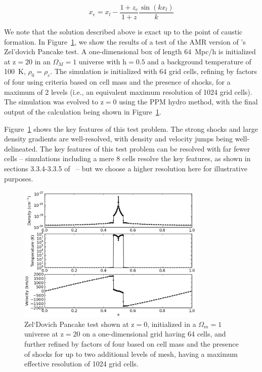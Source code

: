 \begin{equation}
x_e = x_l - \frac{1 + z_c}{1 + z} \frac{\sin(k x_l)}{k}
\end{equation}

We note that the solution described above is exact up to the point of
caustic formation.  In Figure~\ref{fig.pancake}, we show the results
of a test of the AMR version of \enzo's Zel'dovich Pancake test.  A
one-dimensional box of length $64$~Mpc/h is initialized at z$ = 20$ in
an $\Omega_M = 1$ universe with h$ = 0.5$ and a background temperature
of 100~K, $\rho_0 = \rho_c$.  The simulation is initialized with 64
grid cells, refining by factors of four using criteria based on cell
mass and the presence of shocks, for a maximum of 2 levels (i.e., an
equivalent maximum resolution of 1024 grid cells).  The simulation was
evolved to z$ = 0$ using the PPM hydro method, with the final output
of the calculation being shown in Figure~\ref{fig.pancake}.

Figure~\ref{fig.pancake} shows the key features of this test problem.
The strong shocks and large density gradients are well-resolved, with
density and velocity jumps being well-delineated.  The key features of
this test problem can be resolved with far fewer cells -- simulations
including a mere 8 cells resolve the key features, as shown in
sections 3.3.4-3.3.5 of~\citet{1996PhDT........80B} -- but we choose a
higher resolution here for illustrative purposes.

\begin{figure}
\begin{center}
\includegraphics[width=0.8\textwidth]{figures/AMRZeldovichPancake.eps}
\caption{Zel`Dovich Pancake test shown at z$ = 0$, initialized in a
$\Omega_m = 1$ universe at z$ = 20$ on a one-dimensional grid having
64 cells, and further refined by factors of four based on cell mass
and the presence of shocks for up to two additional levels of mesh,
having a maximum effective resolution of 1024 grid cells.}
\label{fig.pancake}
\end{center}
\end{figure}



